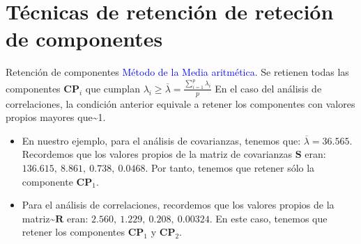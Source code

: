\documentclass[
  spanish,
  ignorenonframetext,
]{beamer}
\providecommand{\tightlist}{%
  \setlength{\itemsep}{0pt}\setlength{\parskip}{0pt}}
\newcommand\blue[1]{\textcolor{blue}{#1}}
\begin{document}
\hypertarget{tuxe9cnicas-de-retenciuxf3n-de-reteciuxf3n-de-componentes}{%
\section{Técnicas de retención de reteción de
componentes}\label{tuxe9cnicas-de-retenciuxf3n-de-reteciuxf3n-de-componentes}}

\begin{frame}{Retención de componentes}
\protect\hypertarget{retenciuxf3n-de-componentes-2}{}
\blue{Método de la Media aritmética}. Se retienen todas las componentes
\(\mathbf{CP}_i\) que cumplan
\(\lambda_i\geq\overline{\lambda}=\frac{\sum_{i=1}^p \lambda_i}{p}\) En
el caso del análisis de correlaciones, la condición anterior equivale a
retener los componentes con valores propios mayores que\textasciitilde1.

\begin{itemize}
\tightlist
\item
  En nuestro ejemplo, para el análisis de covarianzas, tenemos que:
  \(\overline{\lambda}=36.565\). Recordemos que los valores propios de
  la matriz de covarianzas \(\mathbf{S}\) eran:
  \(136.615,\ 8.861,\ 0.738,\ 0.0468\). Por tanto, tenemos que retener
  sólo la componente \(\mathbf{CP}_1\).
\item
  Para el análisis de correlaciones, recordemos que los valores propios
  de la matriz\textasciitilde{}\(\mathbf{R}\) eran:
  \(2.560,\ 1.229,\ 0.208,\ 0.00324\). En este caso, tenemos que retener
  los componentes \(\mathbf{CP}_1\) y \(\mathbf{CP}_2\).
\end{itemize}
\end{frame}
\end{document}
